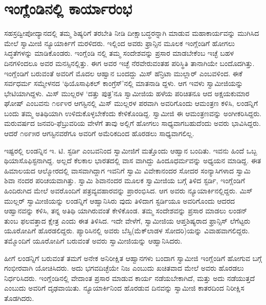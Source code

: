 
\chapter{ಇಂಗ್ಲೆಂಡಿನಲ್ಲಿ ಕಾರ್ಯಾರಂಭ}

\noindent

ಸಹಸ್ರದ್ವೀಪೋದ್ಯಾನದಲ್ಲಿ ತಮ್ಮ ಶಿಷ್ಯರಿಗೆ ತರಬೇತಿ ನೀಡಿ ದೀಕ್ಷಾಬದ್ಧರನ್ನಾಗಿ ಮಾಡುವ ಮಹಾಕಾರ್ಯವನ್ನು ಮುಗಿಸಿದ ಮೇಲೆ ಸ್ವಾಮೀಜಿ ನ್ಯೂಯಾರ್ಕಿಗೆ ಮರಳಿದರು. ಇಲ್ಲಿಂದ ಅವರು ಫ್ರಾನ್ಸಿನ ಮೂಲಕ ಇಂಗ್ಲೆಂಡಿಗೆ ಹೋಗಲು ಸಿದ್ಧತೆಗಳನ್ನು ಮಾಡಿಕೊಂಡರು. ಇಂಗ್ಲೆಂಡಿ ನಲ್ಲಿ ತಮ್ಮ ಸಂದೇಶವನ್ನು ಪ್ರಸಾರ ಮಾಡಬೇಕೆಂಬ ಇಚ್ಛೆ ಬಹಳ ದಿನಗಳಿಂದಲೂ ಅವರ ಮನಸ್ಸಿನಲ್ಲಿತ್ತು. ಈಗ ಅವರ ಇಚ್ಛೆ ನೆರವೇರುವಂತಹ ಪರಿಸ್ಥಿತಿ ತಾನಾಗಿಯೇ ಬಂದೊದಗಿತ್ತು. ಇಂಗ್ಲೆಂಡಿಗೆ ಬರುವಂತೆ ಅವರಿಗೆ ಮೊದಲ ಆಹ್ವಾನ ಬಂದದ್ದು ಮಿಸ್ ಹೆನ್ರಿಟಾ ಮುಲ್ಲಾರ್ ಎಂಬವಳಿಂದ. ಈಕೆ ಸರ್ವಧರ್ಮ ಸಮ್ಮೇಳನದ ‘ಥಿಯೊಸಾಫಿಕಲ್ ಕಾಂಗ್ರೆಸ್​’ನಲ್ಲಿ ಮಾತನಾಡಿ ದ್ದಳು. ಆಗ ಇವಳು ಸ್ವಾಮೀಜಿಯನ್ನು ಭೇಟಿಯಾಗಿದ್ದಳು. ಮಿಸ್ ಮುಲ್ಲರಳ ‘ದತ್ತು ಪುತ್ರ’ನೂ ಸ್ವಾಮೀಜಿಯ ಹಳೆಯ ಪರಿಚಿತನೂ ಆದ ಅಕ್ಷಯಕುಮಾರ ಘೋಷ್ ಎಂಬವನು ೧೮೯೪ರ ಆಗಸ್ಟಿನಲ್ಲಿ ಮಿಸ್ ಮುಲ್ಲರಳ ಪರವಾಗಿ ಅವರಿಗೊಂದು ಆಮಂತ್ರಣ ಕಳಿಸಿ, ಲಂಡನ್ನಿಗೆ ಬಂದು ತಮ್ಮ ಅತಿಥಿಯಾಗಿ ಉಳಿದುಕೊಳ್ಳಬೇಕೆಂದು ಕೇಳಿಕೊಂಡಿದ್ದ. ಸ್ವಾಮೀಜಿ ಈ ಆಮಂತ್ರಣವನ್ನು ಅಂಗೀಕರಿಸಿದ್ದರು. ಮರುವರ್ಷದ ಜನವರಿ-ಫೆಬ್ರುವರಿಯ ವೇಳೆಗೆ ತಾವು ಅಲ್ಲಿಗೆ ಹೋಗಲು ಸಾಧ್ಯವಾಗಬಹುದೆಂದು ಅವರು ಭಾವಿಸಿದ್ದರು. ಆದರೆ ೧೮೯೫ರ ಆಗಸ್ಟಿನವರೆಗೂ ಅವರಿಗೆ ಅಮೆರಿಕದಿಂದ ಹೊರಡಲು ಸಾಧ್ಯವಾಗಲಿಲ್ಲ.

ಇಷ್ಟರಲ್ಲಿ ಲಂಡನ್ನಿನ ಇ. ಟಿ. ಸ್ಟರ್ಡಿ ಎಂಬವನಿಂದ ಸ್ವಾಮೀಜಿಗೆ ಮತ್ತೊಂದು ಆಹ್ವಾನ ಬಂದಿತು. ಇವನು ಹಿಂದೆ ಒಬ್ಬ ಥಿಯಾಸೊಫಿಸ್ಟನಾಗಿದ್ದ. ಅಲ್ಲದೆ ಕೆಲಕಾಲ ಭಾರತದಲ್ಲಿ ವಾಸ ವಾಗಿದ್ದು ಹಿಂದೂಧರ್ಮವನ್ನು ಅಧ್ಯಯನ ಮಾಡಿದ್ದ. ಈತ ಹಿಮಾಲಯದ ಆಲ್ಮೋರದಲ್ಲಿ ವಾಸವಾಗಿದ್ದಾಗ ಇವನಿಗೆ ಸ್ವಾಮಿ ವಿವೇಕಾನಂದರ ಸೋದರ ಸಂನ್ಯಾಸಿಗಳಾದ ಸ್ವಾಮಿ ಶಿವಾ ನಂದರ ಪರಿಚಯವಾಗಿತ್ತು. ಸ್ವಾಮಿ ಶಿವಾನಂದರ ಮೂಲಕ ಸ್ವಾಮೀಜಿಯ ಬಗ್ಗೆ ತಿಳಿದ ಸ್ಟರ್ಡಿ, ಇಂಗ್ಲೆಂಡಿಗೆ ಹಿಂದಿರುಗಿದ ಮೇಲೆ ಅವರೊಂದಿಗೆ ಪತ್ರವ್ಯವಹಾರವನ್ನು ಪ್ರಾರಂಭಿಸಿದ. ಆಗ ಅವರು ನ್ಯೂಯಾರ್ಕಿನಲ್ಲಿದ್ದರು. ಮಿಸ್ ಮುಲ್ಲರ್ ಸ್ವಾಮೀಜಿಯನ್ನು ಲಂಡನ್ನಿಗೆ ಆಹ್ವಾನಿಸಿರು ವುದು ತಿಳಿದಾಗ ಸ್ಟರ್ಡಿಯೂ ಅವರಿಗೊಂದು ಆದರದ ಆಹ್ವಾನವನ್ನು ಕಳಿಸಿ, ತನ್ನ ಅತಿಥಿ ಯಾಗಿರುವಂತೆ ಕೇಳಿಕೊಂಡ. ತಮ್ಮ ಸಂದೇಶವನ್ನು ಪ್ರಸಾರ ಮಾಡಲು ಲಂಡನ್ ತುಂಬ ಫಲವತ್ತಾದ ಕ್ಷೇತ್ರ ಎಂದು ಈತ ತಿಳಿಸಿದ. ಇದೇ ವೇಳೆಗೆ, ಸ್ವಾಮೀಜಿಯ ಆಪ್ತಶಿಷ್ಯರಾದ ಫ್ರಾನ್ಸಿಸ್ ಲೆಗೆಟ್ಟರು ಯೂರೋಪಿಗೆ ಹೊರಡಲಿದ್ದರು. ಪ್ಯಾರಿಸಿನಲ್ಲಿ ಅವರು ಬೆಸ್ಸಿ(ಮೆಕ್​ಲಾಡಳ ಸೋದರಿ)ಯನ್ನು ವಿವಾಹವಾಗಲಿದ್ದರು. ತಮ್ಮೊಂದಿಗೆ ಯೂರೋಪಿಗೆ ಬರುವಂತೆ ಅವರು ಸ್ವಾಮೀಜಿಯನ್ನು ಆಹ್ವಾನಿಸಿದರು.

ಹೀಗೆ ಲಂಡನ್ನಿಗೆ ಬರುವಂತೆ ತಮಗೆ ಅನೇಕ ಅನಿರೀಕ್ಷಿತ ಆಹ್ವಾನಗಳು ಬಂದಾಗ ಸ್ವಾಮೀಜಿ ಇಂಗ್ಲೆಂಡಿಗೆ ಹೋಗುವ ಬಗ್ಗೆ ಗಂಭೀರವಾಗಿ ಯೋಚಿಸಿದರು. ಅದು ಭಗವದಿಚ್ಛೆಯೇ ನಿಜ ಎಂಬುದು ಖಚಿತವಾದ ಮೇಲೆ ಅವರು ಹೊರಡಲು ನಿರ್ಧರಿಸಿದರು. ಇಂಗ್ಲೆಂಡಿನಲ್ಲಿ ವೇದಾಂತ ಪ್ರಸಾರ ಮಾಡುವ ಕಾರ್ಯ ನಡೆಯಬೇಕಾಗಿದೆ, ಮತ್ತು ಅದು ನಡೆಯುತ್ತದೆ ಎಂಬುದು ಅವರಿಗೆ ದೃಢವಾಯಿತು. ನ್ಯೂಯಾರ್ಕಿನಿಂದ ಹೊರಡುವ ದಿನವನ್ನು ಸ್ವಾಮೀಜಿ ಕಾತರದಿಂದ ನಿರೀಕ್ಷಿಸ ತೊಡಗಿದರು.

